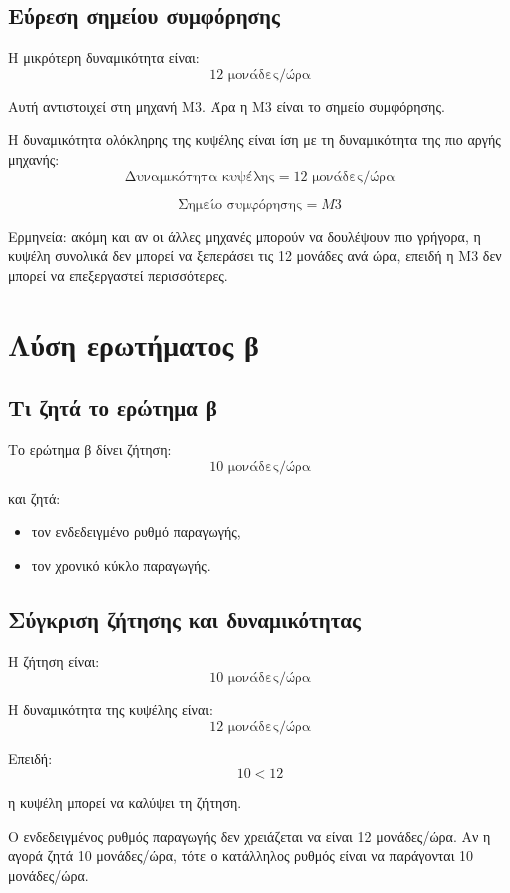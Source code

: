 \documentclass[12pt,a4paper]{article}
\begin{document}
\subsection{Εύρεση σημείου συμφόρησης}

Η μικρότερη δυναμικότητα είναι:
\[
12 \text{ μονάδες/ώρα}
\]

Αυτή αντιστοιχεί στη μηχανή Μ3. Άρα η Μ3 είναι το σημείο συμφόρησης.

Η δυναμικότητα ολόκληρης της κυψέλης είναι ίση με τη δυναμικότητα της πιο αργής μηχανής:
\[
\boxed{\text{Δυναμικότητα κυψέλης}=12 \text{ μονάδες/ώρα}}
\]

\[
\boxed{\text{Σημείο συμφόρησης}=M3}
\]

Ερμηνεία: ακόμη και αν οι άλλες μηχανές μπορούν να δουλέψουν πιο γρήγορα, η κυψέλη συνολικά δεν μπορεί να ξεπεράσει τις 12 μονάδες ανά ώρα, επειδή η Μ3 δεν μπορεί να επεξεργαστεί περισσότερες.

\section{Λύση ερωτήματος β}

\subsection{Τι ζητά το ερώτημα β}

Το ερώτημα β δίνει ζήτηση:
\[
10 \text{ μονάδες/ώρα}
\]

και ζητά:

\begin{itemize}
    \item τον ενδεδειγμένο ρυθμό παραγωγής,
    \item τον χρονικό κύκλο παραγωγής.
\end{itemize}

\subsection{Σύγκριση ζήτησης και δυναμικότητας}

Η ζήτηση είναι:
\[
10 \text{ μονάδες/ώρα}
\]

Η δυναμικότητα της κυψέλης είναι:
\[
12 \text{ μονάδες/ώρα}
\]

Επειδή:
\[
10<12
\]

η κυψέλη μπορεί να καλύψει τη ζήτηση.

Ο ενδεδειγμένος ρυθμός παραγωγής δεν χρειάζεται να είναι 12 μονάδες/ώρα. Αν η αγορά ζητά 10 μονάδες/ώρα, τότε ο κατάλληλος ρυθμός είναι να παράγονται 10 μονάδες/ώρα.
\end{document}

